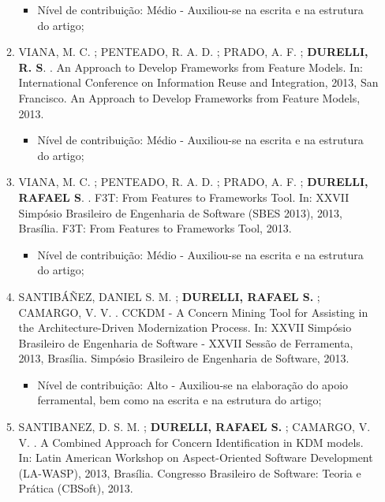 \begin{itemize}
\begin{enumerate}
		    \begin{itemize}
			    \item Nível de contribuição: Médio - Auxiliou-se na escrita e na estrutura do artigo;
			    \end{itemize}
		
		\item VIANA, M. C. ; PENTEADO, R. A. D. ; PRADO, A. F. ; \textbf{DURELLI, R. S}. . An Approach to Develop Frameworks from Feature Models. In: International Conference on Information Reuse and Integration, 2013, San Francisco. An Approach to Develop Frameworks from Feature Models, 2013.
		        \begin{itemize}
			    \item Nível de contribuição: Médio - Auxiliou-se na escrita e na estrutura do artigo;
			    \end{itemize}
		
		\item VIANA, M. C. ; PENTEADO, R. A. D. ; PRADO, A. F. ; \textbf{DURELLI, RAFAEL S}. . F3T: From Features to Frameworks Tool. In: XXVII Simpósio Brasileiro de Engenharia de Software (SBES 2013), 2013, Brasília. F3T: From Features to Frameworks Tool, 2013.
		    \begin{itemize}
			    \item Nível de contribuição: Médio - Auxiliou-se na escrita e na estrutura do artigo;
			    \end{itemize}
		
		\item SANTIBÁÑEZ, DANIEL S. M. ; \textbf{DURELLI, RAFAEL S.} ; CAMARGO, V. V. . CCKDM - A Concern Mining Tool for Assisting in the Architecture-Driven Modernization Process. In: XXVII Simpósio Brasileiro de Engenharia de Software - XXVII Sessão de Ferramenta, 2013, Brasília. Simpósio Brasileiro de Engenharia de Software, 2013.
		    \begin{itemize}
			        \item Nível de contribuição: Alto - Auxiliou-se na elaboração do apoio ferramental, bem como na escrita e na estrutura do artigo;
			    \end{itemize}
		
		\item SANTIBANEZ, D. S. M. ; \textbf{DURELLI, RAFAEL S.} ; CAMARGO, V. V. . A Combined Approach for Concern Identification in KDM models. In: Latin American Workshop on Aspect-Oriented Software Development (LA-WASP), 2013, Brasília. Congresso Brasileiro de Software: Teoria e Prática (CBSoft), 2013.
		

\end{enumerate}
\end{itemize}

